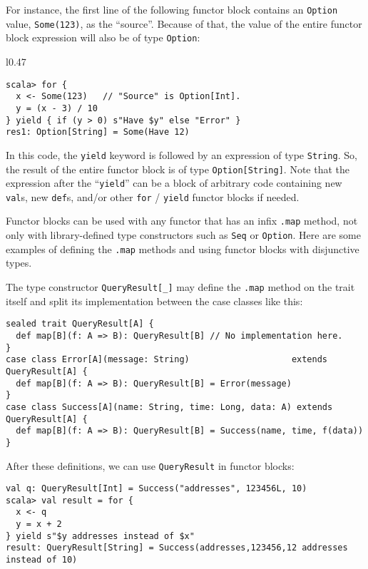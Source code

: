 For instance, the first line of the following functor block contains
an \lstinline!Option! value, \lstinline!Some(123)!, as the ``source''.
Because of that, the value of the entire functor block expression
will also be of type \lstinline!Option!:

\begin{wrapfigure}{l}{0.47\columnwidth}%
\vspace{-0.85\baselineskip}
\begin{lstlisting}
scala> for {
  x <- Some(123)   // "Source" is Option[Int].
  y = (x - 3) / 10
} yield { if (y > 0) s"Have $y" else "Error" }
res1: Option[String] = Some(Have 12)
\end{lstlisting}

\vspace{-1.2\baselineskip}
\end{wrapfigure}%

\noindent In this code, the \lstinline!yield! keyword is followed
by an expression of type \lstinline!String!. So, the result of the
entire functor block is of type \lstinline!Option[String]!. Note
that the expression after the ``\lstinline!yield!'' can be a block
of arbitrary code containing new \lstinline!val!s, new \lstinline!def!s,
and/or other \lstinline!for! / \lstinline!yield! functor blocks
if needed.

Functor blocks can be used with any functor that has an infix \lstinline!.map!
method, not only with library-defined type constructors such as \lstinline!Seq!
or \lstinline!Option!. Here are some examples of defining the \lstinline!.map!
methods and using functor blocks with disjunctive types.

The type constructor \lstinline!QueryResult[_]! may define the \lstinline!.map!
method on the trait itself and split its implementation between the
case classes like this:
\begin{lstlisting}
sealed trait QueryResult[A] {
  def map[B](f: A => B): QueryResult[B] // No implementation here.
}
case class Error[A](message: String)                    extends QueryResult[A] {
  def map[B](f: A => B): QueryResult[B] = Error(message)
}
case class Success[A](name: String, time: Long, data: A) extends QueryResult[A] {
  def map[B](f: A => B): QueryResult[B] = Success(name, time, f(data))
}
\end{lstlisting}
After these definitions, we can use \lstinline!QueryResult! in functor
blocks:
\begin{lstlisting}
val q: QueryResult[Int] = Success("addresses", 123456L, 10)
scala> val result = for {
  x <- q
  y = x + 2
} yield s"$y addresses instead of $x"
result: QueryResult[String] = Success(addresses,123456,12 addresses instead of 10)
\end{lstlisting}

